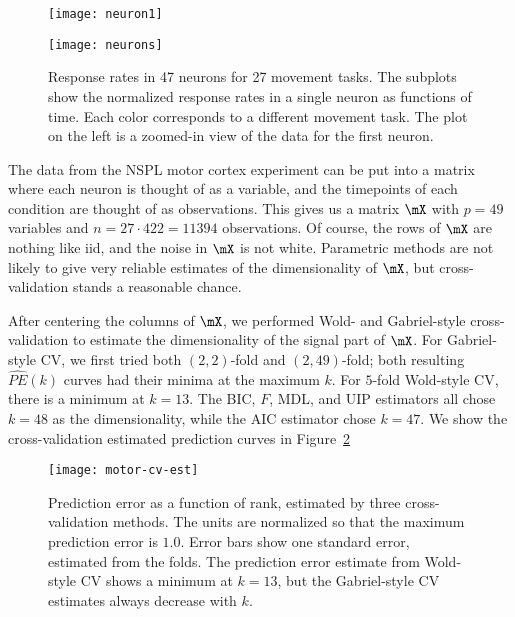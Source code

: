 \begin{figure}[tbh]
    \centering
    \begin{minipage}{0.38\textwidth}
        \begin{center}
            \texttt{[image: neuron1]}
        \end{center}
    \end{minipage}
    \begin{minipage}{0.61\textwidth}
        \begin{center}
            \texttt{[image: neurons]}
        \end{center}
    \end{minipage}
    \caption{
        Response rates in 47 neurons for 27 movement tasks.  The subplots show
        the normalized response rates in a single neuron as functions of time.  
        Each color corresponds to a different movement task.  The plot on
        the left is a zoomed-in view of the data for the first neuron.
    }\label{F:motor-cortex-data}
\end{figure}

The data from the NSPL motor cortex experiment can be put into a matrix where
each neuron is thought of as a variable, and the timepoints of each condition
are thought of as observations. This gives us a matrix $\mX$ with $p = 49$
variables and $n = 27 \cdot 422 = 11394$ observations. Of course, the rows of
$\mX$ are nothing like iid, and the noise in $\mX$ is not white. Parametric
methods are not likely to give very reliable estimates of the dimensionality
of $\mX$, but cross-validation stands a reasonable chance.

After centering the columns of $\mX$, we performed Wold- and Gabriel-style cross-validation to estimate the dimensionality of the signal part of $\mX$.  
For Gabriel-style CV, we first tried both $(2,2)$-fold and $(2,49)$-fold; both resulting $\widehat{PE}(k)$ curves had their minima at the maximum $k$.  For $5$-fold Wold-style CV, there is a minimum at $k=13$.  The BIC, $F$, MDL, and UIP estimators all chose $k=48$ as the dimensionality, while the AIC estimator chose $k=47$.  We show the cross-validation estimated prediction curves in Figure~\ref{F:motor-cv-est}

\begin{figure}
    \centering
    \texttt{[image: motor-cv-est]}
    \caption{
        Prediction error as a function of rank, estimated by three 
        cross-validation methods.  The units are normalized so that the
        maximum prediction error is $1.0$.  Error bars show one standard    
        error, estimated from the folds. The prediction error estimate from
        Wold-style CV shows a minimum at $k=13$, but the Gabriel-style
        CV estimates always decrease with $k$.  
    }\label{F:motor-cv-est}
\end{figure}


